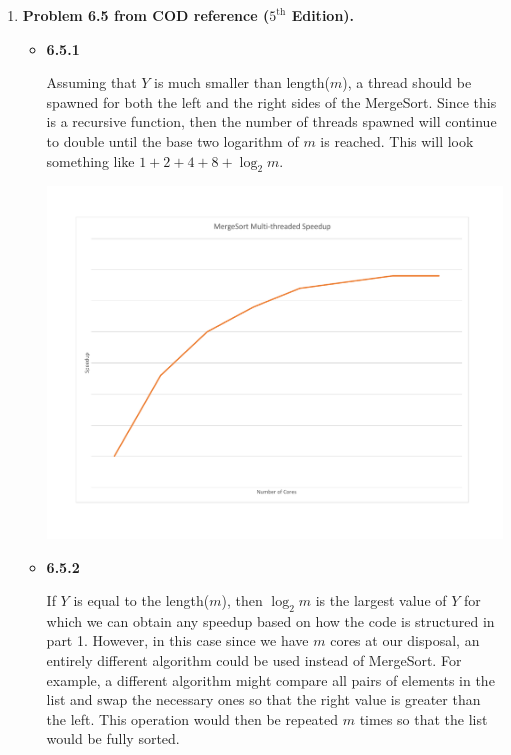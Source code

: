 \documentclass[10pt]{article} %
\begin{document}
\begin{enumerate}[1.]
\begin{itemize}
\end{itemize}

\newpage

\item %
\textbf{Problem 6.5 from COD reference ($5^{\text{th}}$ Edition).  }

\begin{itemize}

\item
\textbf{6.5.1}

Assuming that $Y$ is much smaller than length($m$), a thread should be spawned for both the left and the right sides of the MergeSort.  Since this is a recursive function, then the number of threads spawned will continue to double until the base two logarithm of $m$ is reached.  This will look something like $1 + 2 + 4 + 8 + \log_2 m$.  

\begin{center}
\includegraphics[scale=0.4]{graphs/mergesort.pdf}
\end{center}

\item
\textbf{6.5.2}

If $Y$ is equal to the length($m$), then $\log_2 m$ is the largest value of $Y$ for which we can obtain any speedup based on how the code is structured in part 1.  However, in this case since we have $m$ cores at our disposal, an entirely different algorithm could be used instead of MergeSort.  For example, a different algorithm might compare all pairs of elements in the list and swap the necessary ones so that the right value is greater than the left.  This operation would then be repeated $m$ times so that the list would be fully sorted.  

\end{itemize}

\end{enumerate}
\end{document}
